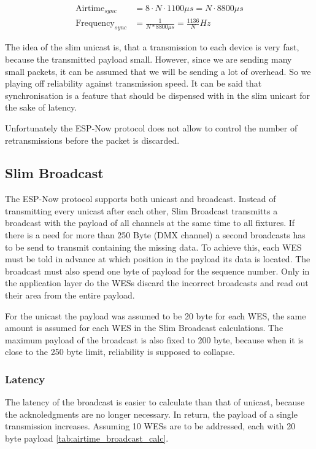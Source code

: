 \begin{align} 
	\text{Airtime}_{sync} &= 8 \cdot N \cdot 1100\mu s = N \cdot 8800\mu s \\
	\text{Frequency}_{sync} &= \frac{1}{N * 8800\mu s} = \frac{1136}{N} Hz
\end{align} 

The idea of the slim unicast is, that a transmission to each device is very fast, because the transmitted payload small.
However, since we are sending many small packets, it can be assumed that we will be sending a lot of overhead.
So we playing off reliability against transmission speed.
It can be said that synchronisation is a feature that should be dispensed with in the slim unicast for the sake of latency.

Unfortunately the ESP-Now protocol does not allow to control the number of retransmissions before the packet is discarded.

\subsection{Slim Broadcast}

The ESP-Now protocol supports both unicast and broadcast.
Instead of transmitting every unicast after each other, 
Slim Broadcast transmitts a broadcast with the payload of all channels at the same time to all fixtures.
If there is a need for more than 250 Byte (DMX channel) a second broadcasts has to be send to transmit containing the missing data.
To achieve this, each WES must be told in advance at which position in the payload its data is located.
The broadcast must also spend one byte of payload for the sequence number.
Only in the application layer do the WESs discard the incorrect broadcasts and read out their area from the entire payload.

For the unicast the payload was assumed to be 20 byte for each WES, the same amount is assumed for each WES in the Slim Broadcast calculations.
The maximum payload of the broadcast is also fixed to 200 byte, because when it is close to the 250 byte limit, 
reliability is supposed to collapse.

\subsubsection*{Latency}

The latency of the broadcast is easier to calculate than that of unicast, because the acknoledgments are no longer necessary.
In return, the payload of a single transmission increases.
Assuming 10 WESs are to be addressed, each with 20 byte payload \ref{tab:airtime_broadcast_calc}.

